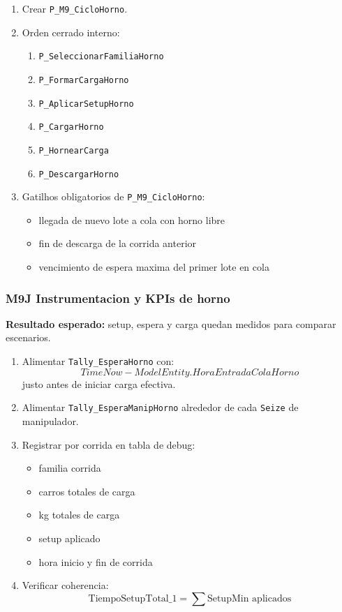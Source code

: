 \documentclass[11pt]{article}
\newcommand{\simio}[1]{\texttt{#1}}
\newcommand{\proc}[1]{\texttt{#1}}
\begin{document}
\begin{enumerate}
  \item Crear \proc{P\_M9\_CicloHorno}.
  \item Orden cerrado interno:
  \begin{enumerate}
    \item \proc{P\_SeleccionarFamiliaHorno}
    \item \proc{P\_FormarCargaHorno}
    \item \proc{P\_AplicarSetupHorno}
    \item \proc{P\_CargarHorno}
    \item \proc{P\_HornearCarga}
    \item \proc{P\_DescargarHorno}
  \end{enumerate}
  \item Gatilhos obligatorios de \proc{P\_M9\_CicloHorno}:
  \begin{itemize}
    \item llegada de nuevo lote a cola con horno libre
    \item fin de descarga de la corrida anterior
    \item vencimiento de espera maxima del primer lote en cola
  \end{itemize}
\end{enumerate}

\subsubsection{M9J Instrumentacion y KPIs de horno}
\textbf{Resultado esperado:} setup, espera y carga quedan medidos para comparar escenarios.

\begin{enumerate}
  \item Alimentar \simio{Tally\_EsperaHorno} con:
  \[
  TimeNow - ModelEntity.HoraEntradaColaHorno
  \]
  justo antes de iniciar carga efectiva.
  \item Alimentar \simio{Tally\_EsperaManipHorno} alrededor de cada \simio{Seize} de manipulador.
  \item Registrar por corrida en tabla de debug:
  \begin{itemize}
    \item familia corrida
    \item carros totales de carga
    \item kg totales de carga
    \item setup aplicado
    \item hora inicio y fin de corrida
  \end{itemize}
  \item Verificar coherencia:
  \[
  \text{TiempoSetupTotal\_1} = \sum \text{SetupMin aplicados}
  \]
\end{enumerate}
\end{document}
